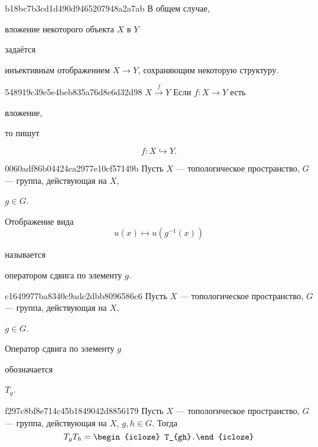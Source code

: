 \begin{note}{b18bc7b3cd1d490d9465207948a2a7ab}
    В общем случае, \begin{icloze}{2}вложение некоторого объекта \({ X }\) в \({ Y }\)\end{icloze} задаётся \begin{icloze}{1}инъективным отображением \({ X \to Y }\), сохраняющим некоторую структуру.\end{icloze}
\end{note}

\begin{note}{548919c39e5e4beb835a76d8e6d32d98}
    \({ X \overset{f}{\to} Y }\)
    Если \({ f : X \to Y }\) есть \begin{icloze}{2}вложение,\end{icloze} то пишут
    \begin{icloze}{1}
        \[
            f : X \hookrightarrow Y.
        \]
    \end{icloze}
\end{note}

\begin{note}{0060adf86b04424ca2977e10cf57149b}
    Пусть \({ X }\) --- топологическое пространство, \({ G }\) --- группа, действующая на \({ X }\),\: \begin{icloze}{3}\({ g \in G }\).\end{icloze}
    \begin{icloze}{2}
        Отображение вида
        \[
            u(x) \mapsto u(g^{-1}(x))
        \]
    \end{icloze}
    называется \begin{icloze}{1}оператором сдвига по элементу \({ g }\).\end{icloze}
\end{note}

\begin{note}{c1649977ba8340c9adc2dbb8096586c6}
    Пусть \({ X }\) --- топологическое пространство, \({ G }\) --- группа, действующая на \({ X }\),\: \begin{icloze}{3}\({ g \in G }\).\end{icloze}
    \begin{icloze}{2}Оператор сдвига по элементу \({ g }\)\end{icloze} обозначается \begin{icloze}{1}\({ T_{g} }\).\end{icloze}
\end{note}

\begin{note}{f297c8bf8e714c45b1849042d8856179}
    Пусть \({ X }\) --- топологическое пространство, \({ G }\) --- группа, действующая на \({ X }\),\: \({ g, h \in G }\).
    Тогда
    \[
        T_{g}T_{h} = \begin{icloze}{1}T_{gh}.\end{icloze}
    \]
\end{note}

